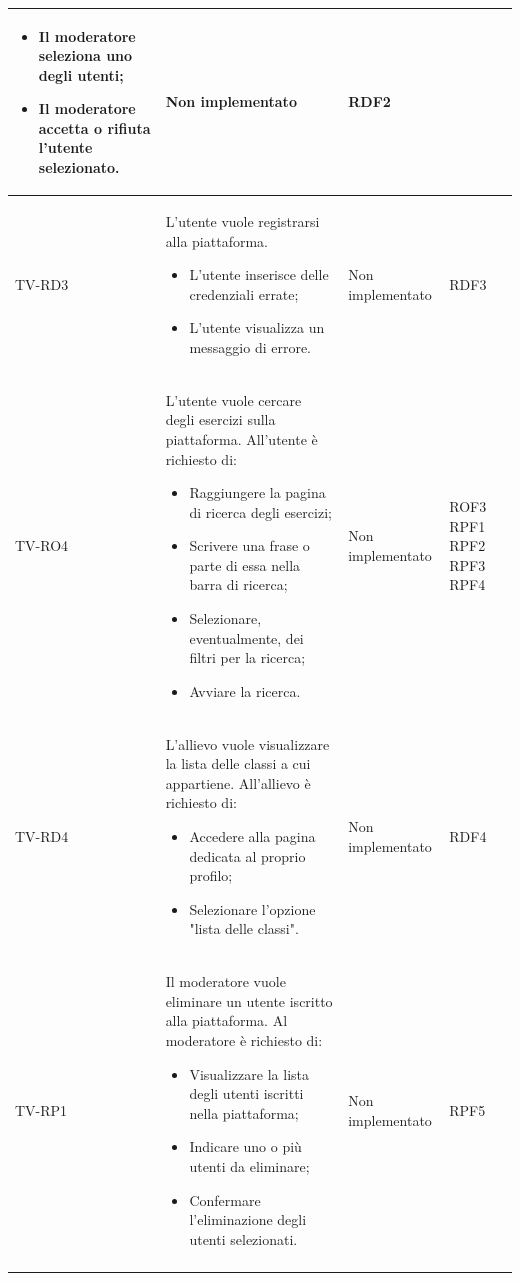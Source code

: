 \begin{longtable}{|>{\centering\arraybackslash}m{1.6cm}|>{\centering\arraybackslash}m{6.41cm}|>{\centering\arraybackslash}m{3.1cm} | >{\centering\arraybackslash}m{2.6cm}|}
\begin{itemize}
			\item Il moderatore seleziona uno degli utenti;
			\item Il moderatore accetta o rifiuta l'utente selezionato.
		\end{itemize}& Non implementato  & RDF2 \\ \hline
		  \rowcolor{LightGray}
		TV-RD3 & L'utente vuole registrarsi alla piattaforma. 
		\begin{itemize}
			\item L'utente inserisce delle credenziali errate;
			\item L'utente visualizza un messaggio di errore.
		\end{itemize}& Non implementato  & RDF3 \\ \hline
		TV-RO4 & L'utente vuole cercare degli esercizi sulla piattaforma. All'utente è richiesto di:
		\begin{itemize}
			\item Raggiungere la pagina di ricerca degli esercizi;
			\item Scrivere una frase o parte di essa nella barra di ricerca;
			\item Selezionare, eventualmente, dei filtri per la ricerca;
			\item Avviare la ricerca.
		\end{itemize}& Non implementato  & ROF3 RPF1 RPF2 RPF3 RPF4\\ \hline
		  \rowcolor{LightGray}
		TV-RD4 & L'allievo vuole visualizzare la lista delle classi a cui appartiene. All'allievo è richiesto di: 
		\begin{itemize}
			\item Accedere alla pagina dedicata al proprio profilo;
			\item Selezionare l'opzione "lista delle classi".
		\end{itemize}& Non implementato  & RDF4 \\ \hline
		TV-RP1 & Il moderatore vuole eliminare un utente iscritto alla piattaforma. Al moderatore è richiesto di: 
		\begin{itemize}
			\item Visualizzare la lista degli utenti iscritti nella piattaforma;
			\item Indicare uno o più utenti da eliminare;
			\item Confermare l'eliminazione degli utenti  selezionati.
		\end{itemize}& Non implementato  & RPF5 \\ \hline
		  \rowcolor{LightGray}

\end{longtable}
